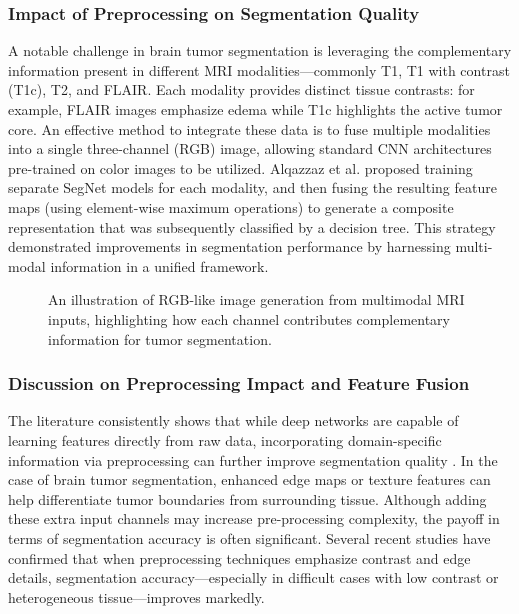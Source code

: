 \subsubsection{Impact of Preprocessing on Segmentation Quality}
\label{sec:preprocessing_impact}
A notable challenge in brain tumor segmentation is leveraging the complementary information present in different MRI modalities—commonly T1, T1 with contrast (T1c), T2, and FLAIR. Each modality provides distinct tissue contrasts: for example, FLAIR images emphasize edema while T1c highlights the active tumor core. An effective method to integrate these data is to fuse multiple modalities into a single three-channel (RGB) image, allowing standard CNN architectures pre-trained on color images to be utilized. Alqazzaz et al. \cite{alqazzaz2019brats} proposed training separate SegNet models for each modality, and then fusing the resulting feature maps (using element-wise maximum operations) to generate a composite representation that was subsequently classified by a decision tree. This strategy demonstrated improvements in segmentation performance by harnessing multi-modal information in a unified framework.

\begin{figure}[ht]
    \centering
    \caption{An illustration of RGB-like image generation from multimodal MRI inputs, highlighting how each channel contributes complementary information for tumor segmentation.}
    \label{fig:modality_fusion}
\end{figure}

\subsubsection{Discussion on Preprocessing Impact and Feature Fusion}
\label{sec:preprocessing_discussion}
The literature consistently shows that while deep networks are capable of learning features directly from raw data, incorporating domain-specific information via preprocessing can further improve segmentation quality \cite{cheng2023feature}. In the case of brain tumor segmentation, enhanced edge maps or texture features can help differentiate tumor boundaries from surrounding tissue. Although adding these extra input channels may increase pre-processing complexity, the payoff in terms of segmentation accuracy is often significant. Several recent studies have confirmed that when preprocessing techniques emphasize contrast and edge details, segmentation accuracy—especially in difficult cases with low contrast or heterogeneous tissue—improves markedly.

